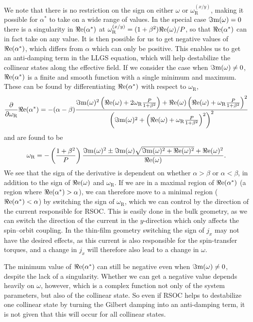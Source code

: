 We note that there is no restriction on the sign on either $\omega$ or $\omega_{\text{R}}^{(x/y)}$, making it possible for $\alpha^*$ to take on a wide range of values. In the special case ${\Im\mathrm{m}}(\omega)=0$ there is a singularity in ${\Re\mathrm{e}}(\alpha^*)$ at $\omega_{\text{R}}^{(x/y)}=(1+\beta^2){\Re\mathrm{e}}(\omega)/P$, so that ${\Re\mathrm{e}}(\alpha^*)$ can in fact take on any value. It is then possible for us to get negative values of ${\Re\mathrm{e}}(\alpha^*)$, which differs from $\alpha$ which can only be positive. This enables us to get an anti-damping term in the LLGS equation, which will help destabilize the collinear states along the effective field. If we consider the case when ${\Im\mathrm{m}}(\omega)\neq0$, ${\Re\mathrm{e}}(\alpha^*)$ is a finite and smooth function with a single minimum and maximum. These can be found by differentiating ${\Re\mathrm{e}}(\alpha^*)$ with respect to $\omega_{\text{R}}$, 
\begin{align}
    \frac{\partial}{\partial\omega_{\text{R}}} {\Re\mathrm{e}}(\alpha^*) = -(\alpha-\beta)\frac{{\Im\mathrm{m}}(\omega)^2\left({\Re\mathrm{e}}(\omega)+2\omega_{\text{R}}\frac{P}{1+\beta^2}\right) + {\Re\mathrm{e}}(\omega)\left({\Re\mathrm{e}}(\omega)+\omega_{\text{R}}\frac{P}{1+\beta^2}\right)^2}{\left({\Im\mathrm{m}}(\omega)^2+\left({\Re\mathrm{e}}(\omega)+\omega_{\text{R}}\frac{P}{1+\beta^2}\right)^2\right)^2}
\end{align}
and are found to be
\begin{align}
    \omega_{\text{R}} = -\left(\frac{1+\beta^2}{P}\right)\frac{{\Im\mathrm{m}}(\omega)^2\pm{\Im\mathrm{m}}(\omega)\sqrt{{\Im\mathrm{m}}(\omega)^2+{\Re\mathrm{e}}(\omega)^2}+{\Re\mathrm{e}}(\omega)^2}{{\Re\mathrm{e}}(\omega)}.
\end{align}
We see that the sign of the derivative is dependent on whether $\alpha>\beta$ or $\alpha<\beta$, in addition to the sign of ${\Re\mathrm{e}}(\omega)$ and $\omega_{\text{R}}$. If we are in a maximal region of ${\Re\mathrm{e}}(\alpha^*)$ (a region where ${\Re\mathrm{e}}(\alpha^*)>\alpha$), we can therefore move to a minimal region (${\Re\mathrm{e}}(\alpha^*)<\alpha$) by switching the sign of $\omega_{\text{R}}$, which we can control by the direction of the current responsible for RSOC. This is easily done in the bulk geometry, as we can switch the direction of the current in the $y$-direction which only affects the spin--orbit coupling. In the thin-film geometry switching the sign of $j_x$ may not have the desired effects, as this current is also responsible for the spin-transfer torques, and a change in $j_x$ will therefore also lead to a change in $\omega$.

The minimum value of ${\Re\mathrm{e}}(\alpha^*)$ can still be negative even when ${\Im\mathrm{m}}(\omega)\neq0$, despite the lack of a singularity. Whether we can get a negative value depends heavily on $\omega$, however, which is a complex function not only of the system parameters, but also of the collinear state. So even if RSOC helps to destabilize one collinear state by turning the Gilbert damping into an anti-damping term, it is not given that this will occur for all collinear states.

